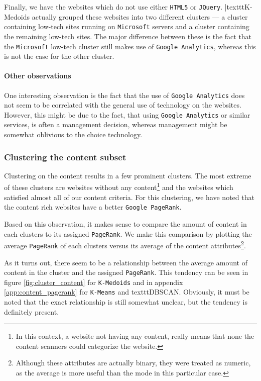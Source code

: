 Finally, we have the websites which do not use either \texttt{HTML5} or \texttt{JQuery}. |texttt{K-Medoids} actually grouped these websites into two different clusters --- a cluster containing low-tech sites running on \texttt{Microsoft} servers and a cluster containing the remaining low-tech sites. The major difference between these is the fact that the \texttt{Microsoft} low-tech cluster still makes use of \texttt{Google Analytics}, whereas this is not the case for the other cluster.

\paragraph{Other observations}

One interesting observation is the fact that the use of \texttt{Google Analytics} does not seem to be correlated with the general use of technology on the websites. However, this might be due to the fact, that using \texttt{Google Analytics} or similar services, is often a management decision, whereas management might be somewhat oblivious to the choice technology.

\subsubsection{Clustering the content subset}

Clustering on the content results in a few prominent clusters. The most extreme of these clusters are websites without any content\footnote{In this context, a website not having any content, really means that none the content scanners could categorize the website.} and the websites which satisfied almost all of our content criteria. For this clustering, we have noted that the content rich websites have a better \texttt{Google PageRank}.

Based on this observation, it makes sense to compare the amount of content in each clusters to its assigned \texttt{PageRank}. We make this comparison by plotting the average \texttt{PageRank} of each clusters versus its average of the content attributes\footnote{Although these attributes are actually binary, they were treated as numeric, as the average is more useful than the mode in this particular case.}.

As it turns out, there seem to be a relationship between the average amount of content in the cluster and the assigned \texttt{PageRank}. This tendency can be seen in figure \ref{fig:cluster_content} for \texttt{K-Medoids} and in appendix \ref{app:content_pagerank} for \texttt{K-Means} and texttt{DBSCAN}. Obviously, it must be noted that the exact relationship is still somewhat unclear, but the tendency is definitely present.

